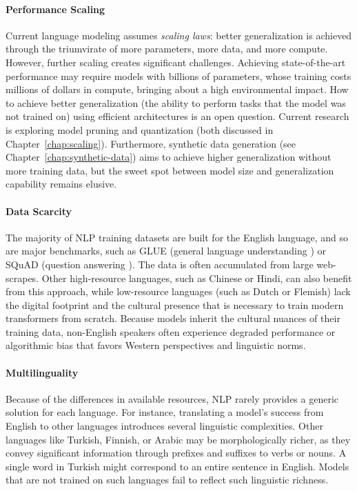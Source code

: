 \paragraph{Performance Scaling}
Current language modeling assumes {\em scaling laws}: better generalization is achieved through the triumvirate of more parameters, more data, and more compute. However, further scaling  creates  significant challenges. Achieving state-of-the-art performance may require models with billions of parameters, whose training costs millions of dollars in compute, bringing about a high environmental impact. How to achieve better generalization (the ability to perform tasks that the model was not  trained on) using efficient architectures is an open question. Current research is exploring  model pruning and quantization (both discussed in Chapter~\ref{chap:scaling}). Furthermore, synthetic data generation (see Chapter~\ref{chap:synthetic-data}) aims to achieve higher generalization without more training data, but the sweet spot between model size and generalization capability remains elusive.

\paragraph{Data Scarcity}
The majority of NLP training  datasets  are built for the English language, and so are major benchmarks, such as GLUE (general language understanding  \citep{wang2018glue}) or SQuAD (question answering \citep{rajpurkar2016squad}). The data is often accumulated from large web-scrapes. Other high-resource languages, such as Chinese or Hindi, can also benefit from this approach, while low-resource languages (such as Dutch or Flemish) lack the digital footprint and the cultural presence that is necessary to train modern transformers from scratch. Because models inherit the cultural nuances of their training data, non-English speakers often experience degraded performance or algorithmic bias that favors Western perspectives and linguistic norms.

\paragraph{Multilinguality}
Because of the differences in available resources, NLP rarely provides a generic solution for each language. For instance, translating a model’s success from English to other languages introduces several linguistic complexities.
Other languages like Turkish, Finnish, or Arabic may be morphologically richer, as they convey significant information through prefixes and suffixes to verbs or nouns. A single word in Turkish might correspond to an entire sentence in English. Models that are not trained on such  languages fail to reflect such linguistic richness.  

